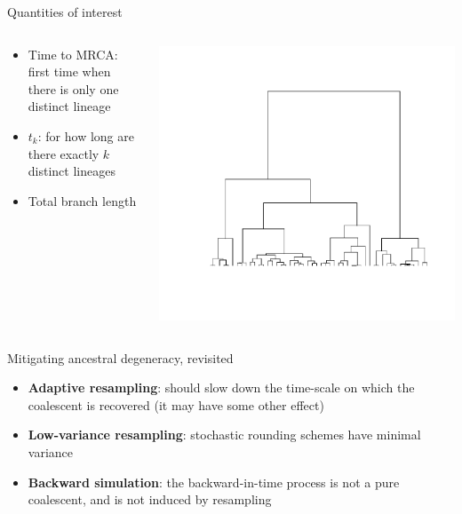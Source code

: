 \documentclass[aspectratio=169]{beamer}
\theoremstyle{definition}
\begin{document}
\begin{frame}{Quantities of interest}
\begin{columns}
\begin{column}{0.45\textwidth}
\begin{itemize}
\item Time to MRCA: first time when there is only one distinct lineage
\item $t_k$: for how long are there exactly $k$ distinct lineages
\item Total branch length
\end{itemize}
\end{column}
\begin{column}{0.45\textwidth}
\includegraphics[width=\textwidth, trim={2.8cm 3cm 1.5cm 2cm}, clip]{ncoalescent.pdf}
\end{column}
\end{columns}
\end{frame}


\begin{frame}{Mitigating ancestral degeneracy, revisited}
\pause
\begin{itemize}[<+->]
\item \textbf{Adaptive resampling}: should slow down the time-scale on which the coalescent is recovered (it may have some other effect)
\item \textbf{Low-variance resampling}: stochastic rounding schemes have minimal variance
\item \textbf{Backward simulation}: the backward-in-time process is not a pure coalescent, and is not induced by resampling
\end{itemize}
\end{frame}
\end{document}
